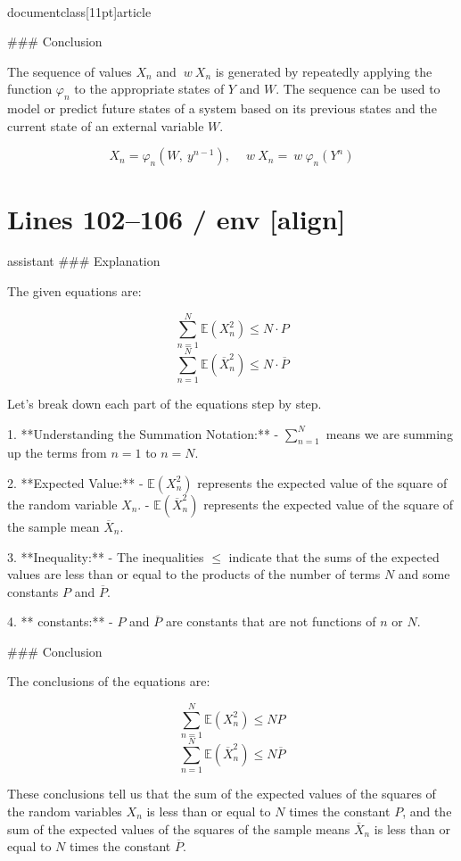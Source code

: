 \\documentclass[11pt]{article}
\begin{document}
### Conclusion

The sequence of values \(X_n\) and \(\ w\ X_n\) is generated by repeatedly applying the function \(\varphi_n\) to the appropriate states of \(Y\) and \(W\). The sequence can be used to model or predict future states of a system based on its previous states and the current state of an external variable \(W\).

\[
\boxed{X_n = \varphi_n(W, \ y^{n-1}), \quad \ w\ X_n = \ w\ \varphi_n(Y^n)}
\]


\section*{Lines 102–106 / env [align]}
assistant
### Explanation

The given equations are:

\[
\sum_{n=1}^N\mathbb{E}(X_n^2) \leq N\cdot P 
\]
\[
\sum_{n=1}^N\mathbb{E}(\overline{X}_n^2) \leq N\cdot \overline{P}
\]

Let's break down each part of the equations step by step.

1. **Understanding the Summation Notation:**
   - \(\sum_{n=1}^N\) means we are summing up the terms from \(n=1\) to \(n=N\).

2. **Expected Value:**
   - \(\mathbb{E}(X_n^2)\) represents the expected value of the square of the random variable \(X_n\).
   - \(\mathbb{E}(\overline{X}_n^2)\) represents the expected value of the square of the sample mean \(\overline{X}_n\).

3. **Inequality:**
   - The inequalities \(\leq\) indicate that the sums of the expected values are less than or equal to the products of the number of terms \(N\) and some constants \(P\) and \(\overline{P}\).

4. ** constants:**
   - \(P\) and \(\overline{P}\) are constants that are not functions of \(n\) or \(N\).

### Conclusion

The conclusions of the equations are:

\[
\sum_{n=1}^N\mathbb{E}(X_n^2) \leq N P
\]
\[
\sum_{n=1}^N\mathbb{E}(\overline{X}_n^2) \leq N \overline{P}
\]

These conclusions tell us that the sum of the expected values of the squares of the random variables \(X_n\) is less than or equal to \(N\) times the constant \(P\), and the sum of the expected values of the squares of the sample means \(\overline{X}_n\) is less than or equal to \(N\) times the constant \(\overline{P}\).
\end{document}
